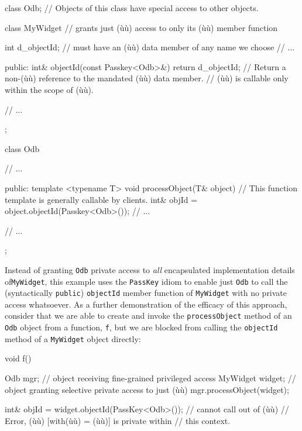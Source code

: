 \begin{emcppslisting}[emcppsbatch=e3]
class Odb;      // Objects of this class have special access to other objects.

class MyWidget  // grants just (ù{}ù) access to only its (ù{}ù) member function
{
    int d_objectId;  // must have an (ù{}ù) data member of any name we choose
    // ...

public:
    int& objectId(const Passkey<Odb>&) { return d_objectId; }
        // Return a non-(ù{}ù) reference to the mandated (ù{}ù) data member.
        // (ù{}ù) is callable only within the scope of (ù{}ù).

    // ...
};

class Odb
{
    // ...

public:
    template <typename T>
    void processObject(T& object)
        // This function template is generally callable by clients.
    {
        int& objId = object.objectId(Passkey<Odb>());
        // ...
    }

    // ...
};
\end{emcppslisting}

\noindent Instead of granting \lstinline!Odb! private access to \emph{all}
encapsulated implementation details of\linebreak[4] \mbox{\lstinline!MyWidget!}, this example
uses the \lstinline!PassKey! idiom to enable just \lstinline!Odb! to call the
(syntactically \lstinline!public!) \lstinline!objectId! member function of
\lstinline!MyWidget! with no private access whatsoever. As a further
demonstration of the efficacy of this approach, consider that we are
able to create and invoke the \lstinline!processObject! method of an
\lstinline!Odb! object from a function, \lstinline!f!, but we are blocked from
calling the \lstinline!objectId! method of a \lstinline!MyWidget! object
directly:

\begin{emcppslisting}[emcppsbatch=e3]
void f()
{
    Odb mgr;          // object receiving fine-grained privileged access
    MyWidget widget;  // object granting selective private access to just (ù{}ù)
    mgr.processObject(widget);

    int& objId = widget.objectId(PassKey<Odb>());  // cannot call out of (ù{}ù)
       // Error, (ù{}ù) [with(ù{}ù) = (ù{}ù)] is private within
       // this context.
}
\end{emcppslisting}

